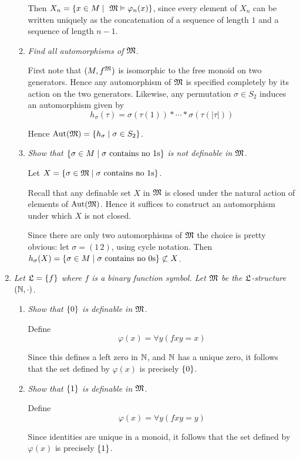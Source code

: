 \documentclass[10pt]{article}
\begin{document}
\begin{enumerate}
\begin{enumerate}
Then $X_n = \left\{ x \in M \mid \ \mathfrak{M} \vDash \varphi_n(x) \right\}$, since every element of $X_n$ can be written uniquely as the concatenation of a sequence of length $1$ and a sequence of length $n-1$.
\item \emph{Find all automorphisms of $\mathfrak{M}$.}

First note that $(M, f^{\mathfrak{M}})$ is isomorphic to the free monoid on two generators.  Hence any automorphism of $\mathfrak{M}$ is specified completely by its action on the two generators.  Likewise, any permutation $\sigma \in S_2$ induces an automorphism given by 
\[
h_\sigma(\tau) = \sigma(\tau(1)) \ast \cdots \ast \sigma(\tau(|\tau|))
\]

Hence $\operatorname{Aut}(\mathfrak{M}) = \left\{ h_\sigma \mid \sigma \in S_2 \right\}$.

\item \emph{Show that $\left\{ \sigma \in M \mid \sigma \mbox{ contains no $1$s} \right\}$ is not definable in $\mathfrak{M}$.}

Let $X = \left\{ \sigma \in \mathfrak{M} \mid \sigma \mbox{ contains no $1$s} \right\}$.

Recall that any definable set $X$ in $\mathfrak{M}$ is closed under the natural action of elements of $\operatorname{Aut}(\mathfrak{M})$.  Hence it suffices to construct an automorphism under which $X$ is not closed.

Since there are only two automorphisms of $\mathfrak{M}$ the choice is pretty obvious: let $\sigma = (1\,2)$, using cycle notation.  Then $h_\sigma(X) = \left\{ \sigma \in M \mid \sigma \mbox{ contains no $0$s} \right\} \not\subset X$.

\end{enumerate}

\item \emph{Let $\mathfrak{L}=\left\{ f \right\}$ where $f$ is a binary function symbol.  Let $\mathfrak{M}$ be the $\mathfrak{L}$-structure $(\mathbb{N}, \cdot)$.}
\begin{enumerate}
\item \emph{Show that $\left\{ 0 \right\}$ is definable in $\mathfrak{M}$.}

Define $$\varphi(x) = \forall y (fxy = x)$$

Since this defines a left zero in $\mathbb{N}$, and $\mathbb{N}$ has a unique zero, it follows that the set defined by $\varphi(x)$ is precisely $\left\{ 0 \right\}$.

\item \emph{Show that $\left\{ 1 \right\}$ is definable in $\mathfrak{M}$.}

Define $$\varphi(x) = \forall y (fxy = y)$$

Since identities are unique in a monoid, it follows that the set defined by $\varphi(x)$ is precisely $\left\{ 1 \right\}$.


\end{enumerate}
\end{enumerate}
\end{document}
